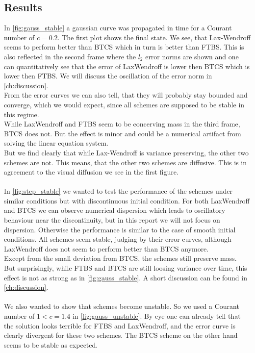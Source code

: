 \subsection{Results}
In \cref{fig:gauss_stable} a gaussian curve was propagated in time for a Courant number of $c=0.2$. The first plot shows the final state. We see, that Lax-Wendroff seems to perform better than BTCS which in turn is better than FTBS. This is also reflected in the second frame where the  $l_2$ error norms are shown and one can quantitatively see that the error of LaxWendroff is lower then BTCS which is lower then FTBS. We will discuss the oscillation of the error norm in \cref{ch:discussion}. \\
From the error curves we can also tell, that they will probably stay bounded and converge, which we would expect, since all schemes are supposed to be stable in this regime. \\
While LaxWendroff and FTBS seem to be concerving mass in the third frame, BTCS does not. But the effect is minor and could be a numerical artifact from solving the linear equation system. \\
But we find clearly that while Lax-Wendroff is variance preserving, the other two schemes are not. This means, that the other two schemes are diffusive. This is in agreement to the visual diffusion we see in the first figure.\\ \\
In \cref{fig:step_stable} we wanted to test the performance of the schemes under similar conditions but with discontinuous initial condition. For both LaxWendroff and BTCS we can observe numerical dispersion which leads to oscillatory behaviour near the discontinuity, but in this report we will not focus on dispersion. Otherwise the performance is similar to the case of smooth initial conditions. All schemes seem stable, judging by their error curves, although LaxWendroff does not seem to perform better than BTCS anymore.\\
Except from the small deviation from BTCS, the schemes still preserve mass. \\
But surprisingly, while FTBS and BTCS are still loosing variance over time, this effect is not as strong as in \cref{fig:gauss_stable}. A short discussion can be found in \cref{ch:discussion}. \\ \\
We also wanted to show that schemes become unstable. So we used a Courant number of $1<c=1.4$ in \cref{fig:gauss_unstable}. By eye one can already tell that the solution looks terrible for FTBS and LaxWendroff, and the error curve is clearly divergent for these two schemes. The BTCS scheme on the other hand seems to be stable as expected.\\
